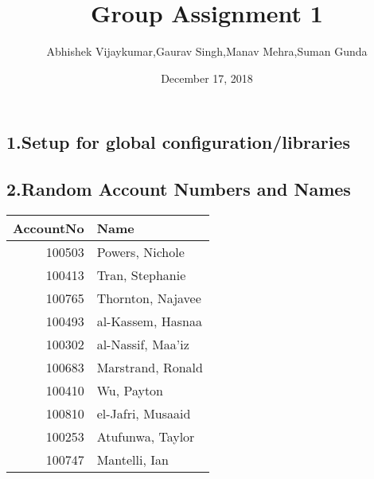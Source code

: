 \documentclass[]{article}
\title{Group Assignment 1}
\author{Abhishek Vijaykumar,Gaurav Singh,Manav Mehra,Suman Gunda}
\date{December 17, 2018}
\newenvironment{Shaded}{\begin{snugshade}}{\end{snugshade}}
\newcommand{\KeywordTok}[1]{\textcolor[rgb]{0.13,0.29,0.53}{\textbf{#1}}}
\newcommand{\DataTypeTok}[1]{\textcolor[rgb]{0.13,0.29,0.53}{#1}}
\newcommand{\DecValTok}[1]{\textcolor[rgb]{0.00,0.00,0.81}{#1}}
\newcommand{\StringTok}[1]{\textcolor[rgb]{0.31,0.60,0.02}{#1}}
\newcommand{\CommentTok}[1]{\textcolor[rgb]{0.56,0.35,0.01}{\textit{#1}}}
\newcommand{\OtherTok}[1]{\textcolor[rgb]{0.56,0.35,0.01}{#1}}
\newcommand{\OperatorTok}[1]{\textcolor[rgb]{0.81,0.36,0.00}{\textbf{#1}}}
\newcommand{\NormalTok}[1]{#1}
\begin{document}
\maketitle

\subsection{1.Setup for global
configuration/libraries}\label{setup-for-global-configurationlibraries}

\subsection{2.Random Account Numbers and
Names}\label{random-account-numbers-and-names}

\begin{Shaded}
\end{Shaded}

\begin{table}[H]
\centering
\begin{tabular}{r|l}
\hline
AccountNo & Name\\
\hline
100503 & Powers, Nichole\\
\hline
100413 & Tran, Stephanie\\
\hline
100765 & Thornton, Najavee\\
\hline
100493 & al-Kassem, Hasnaa\\
\hline
100302 & al-Nassif, Maa'iz\\
\hline
100683 & Marstrand, Ronald\\
\hline
100410 & Wu, Payton\\
\hline
100810 & el-Jafri, Musaaid\\
\hline
100253 & Atufunwa, Taylor\\
\hline
100747 & Mantelli, Ian\\
\hline
\end{tabular}
\end{table}
\end{document}
